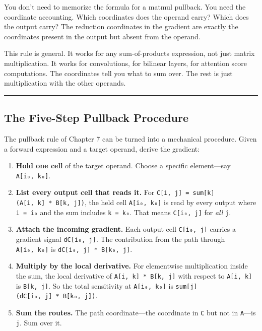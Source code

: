 \documentclass[11pt,]{article}
\providecommand{\tightlist}{%
  \setlength{\itemsep}{0pt}\setlength{\parskip}{0pt}}
\begin{document}
You don't need to memorize the formula for a matmul pullback. You need
the coordinate accounting. Which coordinates does the operand carry?
Which does the output carry? The reduction coordinates in the gradient
are exactly the coordinates present in the output but absent from the
operand.

This rule is general. It works for any sum-of-products expression, not
just matrix multiplication. It works for convolutions, for bilinear
layers, for attention score computations. The coordinates tell you what
to sum over. The rest is just multiplication with the other operands.

\begin{center}\rule{0.5\linewidth}{0.4pt}\end{center}

\hypertarget{the-five-step-pullback-procedure}{%
\subsection{The Five-Step Pullback
Procedure}\label{the-five-step-pullback-procedure}}

The pullback rule of Chapter 7 can be turned into a mechanical
procedure. Given a forward expression and a target operand, derive the
gradient:

\begin{enumerate}
\def\labelenumi{\arabic{enumi}.}
\tightlist
\item
  \textbf{Hold one cell} of the target operand. Choose a specific
  element---say \texttt{A{[}i₀,\ k₀{]}}.
\item
  \textbf{List every output cell that reads it.} For
  \texttt{C{[}i,\ j{]}\ =\ sum{[}k{]}(A{[}i,\ k{]}\ *\ B{[}k,\ j{]})},
  the held cell \texttt{A{[}i₀,\ k₀{]}} is read by every output where
  \texttt{i\ =\ i₀} and the sum includes \texttt{k\ =\ k₀}. That means
  \texttt{C{[}i₀,\ j{]}} for \emph{all} \texttt{j}.
\item
  \textbf{Attach the incoming gradient.} Each output cell
  \texttt{C{[}i₀,\ j{]}} carries a gradient signal
  \texttt{dC{[}i₀,\ j{]}}. The contribution from the path through
  \texttt{A{[}i₀,\ k₀{]}} is \texttt{dC{[}i₀,\ j{]}\ *\ B{[}k₀,\ j{]}}.
\item
  \textbf{Multiply by the local derivative.} For elementwise
  multiplication inside the sum, the local derivative of
  \texttt{A{[}i,\ k{]}\ *\ B{[}k,\ j{]}} with respect to
  \texttt{A{[}i,\ k{]}} is \texttt{B{[}k,\ j{]}}. So the total
  sensitivity at \texttt{A{[}i₀,\ k₀{]}} is
  \texttt{sum{[}j{]}(dC{[}i₀,\ j{]}\ *\ B{[}k₀,\ j{]})}.
\item
  \textbf{Sum the routes.} The path coordinate---the coordinate in
  \texttt{C} but not in \texttt{A}---is \texttt{j}. Sum over it.
\end{enumerate}
\end{document}

